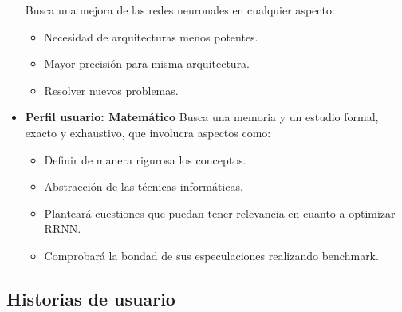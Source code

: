 \begin{itemize}
Busca una mejora de las redes neuronales en cualquier aspecto:

\begin{itemize}
    \item Necesidad de arquitecturas menos potentes.
    \item Mayor precisión para misma arquitectura.
    \item Resolver nuevos problemas.
\end{itemize}

\item \textbf{Perfil usuario: Matemático}
Busca una memoria y un estudio formal, exacto  y exhaustivo, que involucra aspectos como: 
\begin{itemize}
    \item Definir de manera rigurosa los conceptos.
    \item Abstracción de las técnicas informáticas.
    \item Planteará cuestiones que puedan tener relevancia en cuanto a optimizar RRNN.
    \item Comprobará la bondad de sus especulaciones realizando benchmark.
\end{itemize}
\end{itemize}

\subsection{Historias de usuario}  

